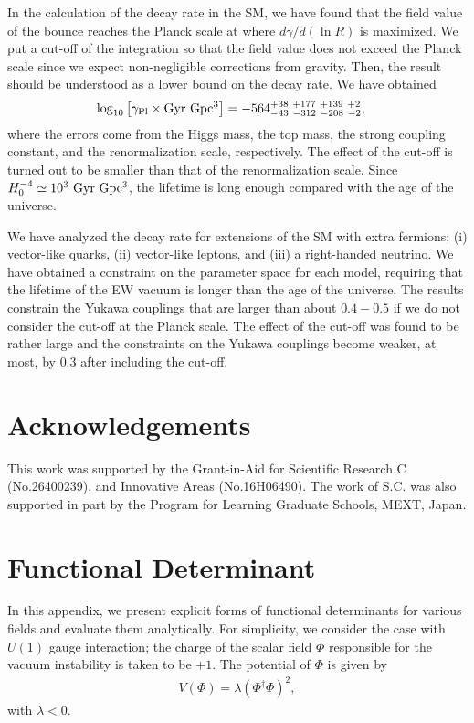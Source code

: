 \documentclass[12pt]{article}
\begin{document}
In the calculation of the decay rate in the SM, we have found that the
field value of the bounce reaches the Planck scale at where
$d\gamma/d(\ln R)$ is maximized. We put a cut-off of the integration so
that the field value does not exceed the Planck scale since we expect
non-negligible corrections from gravity. Then, the result should be
understood as a lower bound on the decay rate. We have obtained
\begin{align}
 \log_{10}\left[\gamma_{\rm Pl}\times{\rm Gyr~Gpc^3}\right]
  & = -564^{+38~+177~+139~+2}_{-43~-312~-208~-2},
\end{align}
where the errors come from the Higgs mass, the top mass, the strong
coupling constant, and the renormalization scale, respectively. The
effect of the cut-off is turned out to be smaller than that of the
renormalization scale. Since $H_0^{-4}\simeq10^3~{\rm Gyr~Gpc^3}$, the
lifetime is long enough compared with the age of the universe.

We have analyzed the decay rate for extensions of the SM with extra
fermions; (i) vector-like quarks, (ii) vector-like leptons, and (iii) a
right-handed neutrino.  We have obtained a constraint on the parameter
space for each model, requiring that the lifetime of the EW vacuum is
longer than the age of the universe. The results constrain the Yukawa
couplings that are larger than about $0.4-0.5$ if we do not consider the
cut-off at the Planck scale. The effect of the cut-off was found to be
rather large and the constraints on the Yukawa couplings become weaker,
at most, by $0.3$ after including the cut-off.

\section*{Acknowledgements}
 This work was supported by the Grant-in-Aid for Scientific Research C
 (No.26400239), and Innovative Areas (No.16H06490). The work of S.C. was
 also supported in part by the Program for Learning Graduate Schools,
 MEXT, Japan.


\appendix
\section{Functional Determinant}
\label{apx_determinantJ}
\setcounter{equation}{0}

In this appendix, we present explicit forms of functional determinants
for various fields and evaluate them analytically.  For simplicity, we
consider the case with $U(1)$ gauge interaction; the charge of the
scalar field $\Phi$ responsible for the vacuum instability is taken to
be $+1$.  The potential of $\Phi$ is given by
\begin{align}
  V(\Phi) = \lambda(\Phi^\dagger\Phi)^2,
\end{align}
with $\lambda<0$.
\end{document}
